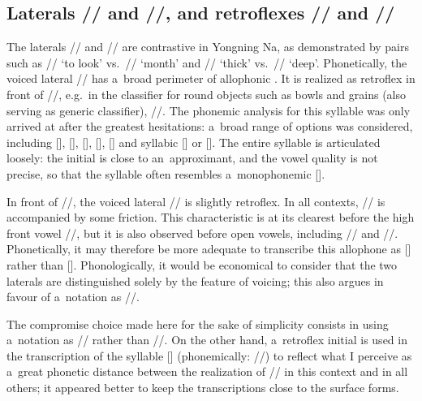 			
			\subsection{Laterals  // and  //, and retroflexes // and  //}
			\label{sec:lateralsandandtheretroflexapproximant}
			
			
			The laterals // and // are contrastive in Yongning Na, as demonstrated by pairs such
			as // ‘to look’ vs.\ // ‘month’ and // ‘thick’ vs.\ //
			‘deep’. Phonetically, the voiced lateral // has a~broad perimeter of allophonic . It
			is realized as retroflex in front of //, e.g.~in the classifier for round objects such as
			bowls and grains (also serving as generic classifier), //. The phonemic analysis for this
			syllable was only arrived at after the greatest hesitations: a~broad range of options was
			considered, including [], [], [], [], [] and syllabic
			[] or []. The entire syllable is articulated loosely: the initial is close to
			an~approximant, and the vowel quality is not precise, so that the syllable often resembles
			a~monophonemic [].
			
			In front of //, the voiced lateral // is slightly retroflex. In all contexts,
			// is accompanied by some friction. This characteristic is at its clearest before the high
			front vowel //, but it is also observed before open vowels, including // and
			//. Phonetically, it may therefore be more adequate to transcribe this allophone as []
			rather than []. Phonologically, it would be economical to consider that the two laterals are
			distinguished solely by the feature of voicing; this also argues in favour of a~notation as
			//.
			
			The compromise choice made here for the sake of simplicity consists in using a~notation as //
			rather than //. On the other hand, a~retroflex initial is used in the transcription of the
			syllable [] (phonemically: //) to reflect what I perceive as a~great phonetic
			distance between the realization of // in this context and in all others; it appeared better to keep the
			transcriptions close to the surface forms.
			
